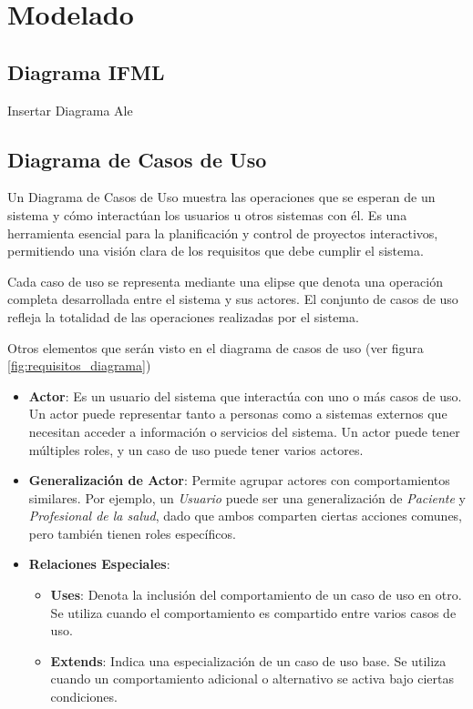\documentclass{article}
\begin{document}
\section{Modelado}

\subsection{Diagrama IFML}

Insertar Diagrama Ale

\subsection{Diagrama de Casos de Uso}

Un Diagrama de Casos de Uso muestra las operaciones que se esperan de un sistema y cómo interactúan los usuarios u otros sistemas con él. Es una herramienta esencial para la planificación y control de proyectos interactivos, permitiendo una visión clara de los requisitos que debe cumplir el sistema.

Cada caso de uso se representa mediante una elipse que denota una operación completa desarrollada entre el sistema y sus actores. El conjunto de casos de uso refleja la totalidad de las operaciones realizadas por el sistema.

Otros elementos que serán visto en el diagrama de casos de uso (ver figura \ref{fig:requisitos_diagrama})

\begin{itemize}
	\item \textbf{Actor}: Es un usuario del sistema que interactúa con uno o más casos de uso. Un actor puede representar tanto a personas como a sistemas externos que necesitan acceder a información o servicios del sistema. Un actor puede tener múltiples roles, y un caso de uso puede tener varios actores.
	
	\item \textbf{Generalización de Actor}: Permite agrupar actores con comportamientos similares. Por ejemplo, un \textit{Usuario} puede ser una generalización de \textit{Paciente} y \textit{Profesional de la salud}, dado que ambos comparten ciertas acciones comunes, pero también tienen roles específicos.
	
	\item \textbf{Relaciones Especiales}:
	\begin{itemize}
		\item \textbf{Uses}: Denota la inclusión del comportamiento de un caso de uso en otro. Se utiliza cuando el comportamiento es compartido entre varios casos de uso.
		\item \textbf{Extends}: Indica una especialización de un caso de uso base. Se utiliza cuando un comportamiento adicional o alternativo se activa bajo ciertas condiciones.
	\end{itemize}
\end{itemize}
\end{document}
